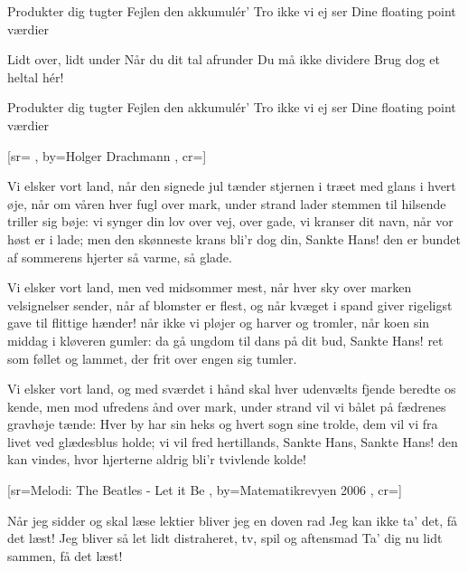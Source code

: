 \documentclass[pdftex,12pt]{article}
\begin{document}
\begin{songs}{}
\endverse
\beginverse
        Produkter dig tugter
        Fejlen den akkumulér'
        Tro ikke vi ej ser
        Dine floating point værdier


\endverse
\beginverse
        Lidt over, lidt under
        Når du dit tal afrunder
        Du må ikke dividere
        Brug dog et heltal hér!

\endverse
\beginverse
        Produkter dig tugter
        Fejlen den akkumulér'
        Tro ikke vi ej ser
        Dine floating point værdier

\endverse
\endsong



﻿[sr={}
,
by={Holger Drachmann}
,
cr={}]\hypertarget{Midsommervisen -- Vi elsker vort land}{}
\label{song7}

\beginverse
Vi elsker vort land,
når den signede jul
tænder stjernen i træet med glans i hvert øje,
når om våren hver fugl
over mark, under strand
lader stemmen til hilsende triller sig bøje:
vi synger din lov over vej, over gade,
vi kranser dit navn, når vor høst er i lade;
\lrep men den skønneste krans
bli’r dog din, Sankte Hans!
den er bundet af sommerens hjerter så varme, så glade.\rrep
\endverse

\beginverse
Vi elsker vort land,
men ved midsommer mest,
når hver sky over marken velsignelser sender,
når af blomster er flest,
og når kvæget i spand
giver rigeligst gave til flittige hænder!
når ikke vi pløjer og harver og tromler,
når koen sin middag i kløveren gumler:
\lrep da gå ungdom til dans
på dit bud, Sankte Hans!
ret som føllet og lammet, der frit over engen sig tumler.\rrep
\endverse

\beginverse
Vi elsker vort land,
og med sværdet i hånd
skal hver udenvælts fjende beredte os kende,
men mod ufredens ånd
over mark, under strand
vil vi bålet på fædrenes gravhøje tænde:
Hver by har sin heks og hvert sogn sine trolde,
dem vil vi fra livet ved glædesblus holde;
\lrep vi vil fred hertillands,
Sankte Hans, Sankte Hans!
den kan vindes, hvor hjerterne aldrig bli’r tvivlende kolde!\rrep
\endverse
\endsong



﻿[sr={Melodi: The Beatles - Let it Be}
,
by={Matematikrevyen 2006}
,
cr={}]\hypertarget{Få det læst}{}
\label{song8}

\beginverse
Når jeg sidder og skal læse lektier bliver jeg en doven rad
Jeg kan ikke ta’ det, få det læst!
Jeg bliver så let lidt distraheret, tv, spil og aftensmad
Ta’ dig nu lidt sammen, få det læst!
\endverse


\end{songs}
\end{document}
